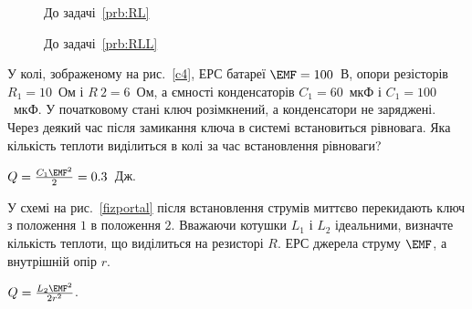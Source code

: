 \begin{figure}[h!]\centering
	\begin{minipage}[b]{0.45\linewidth}\centering
		\caption{До задачі~\ref{prb:RL}}
		\label{RL}
	\end{minipage}
	\begin{minipage}[b]{0.45\linewidth}\centering
		\caption{До задачі~\ref{prb:RLL}}
		\label{RLL}
	\end{minipage}
\end{figure}


\begin{problem}\label{prb:c4}
У колі, зображеному на рис.~\ref{c4}, ЕРС батареї $\EMF = 100$~В, опори резісторів $R_1 = 10$~Ом і $R~2 = 6$~Ом, а ємності конденсаторів $C_1 = 60$~мкФ і $C_1 = 100$~мкФ. У початковому стані ключ розімкнений, а конденсатори не заряджені. Через деякий час після замикання ключа в системі встановиться рівновага. Яка кількість теплоти виділиться в колі за час встановлення рівноваги?
\begin{solution}
	$Q = \frac{C_1\EMF^2}{2} = 0.3$~Дж.
\end{solution}
\end{problem}


\begin{problem}\label{prb:fizportal}
У схемі на рис.~\ref{fizportal} після встановлення струмів миттєво перекидають ключ з положення $1$ в положення $2$. Вважаючи котушки $L_1$ і $L_2$ ідеальними, визначте кількість теплоти, що виділиться на резисторі $R$. ЕРС джерела струму $\EMF$, а внутрішній опір $r$.
\begin{solution}
	$Q = \frac{L_2\EMF^2}{2r^2}$.
\end{solution}
\end{problem}

